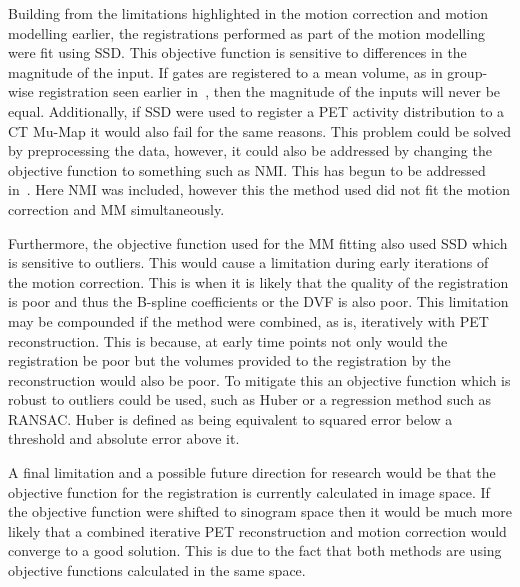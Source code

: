         Building from the limitations highlighted in the motion correction and motion modelling earlier, the registrations performed as part of the motion modelling were fit using \gls{SSD}. This objective function is sensitive to differences in the magnitude of the input. If gates are registered to a mean volume, as in group-wise registration seen earlier in~, then the magnitude of the inputs will never be equal. Additionally, if \gls{SSD} were used to register a \gls{PET} activity distribution to a \gls{CT} \gls{Mu-Map} it would also fail for the same reasons. This problem could be solved by preprocessing the data, however, it could also be addressed by changing the objective function to something such as \gls{NMI}. This has begun to be addressed in~. Here \gls{NMI} was included, however this the method used did not fit the motion correction and \gls{MM} simultaneously.
        
        Furthermore, the objective function used for the \gls{MM} fitting also used \gls{SSD} which is sensitive to outliers. This would cause a limitation during early iterations of the motion correction. This is when it is likely that the quality of the registration is poor and thus the B-spline coefficients or the \gls{DVF} is also poor. This limitation may be compounded if the method were combined, as is, iteratively with \gls{PET} reconstruction. This is because, at early time points not only would the registration be poor but the volumes provided to the registration by the reconstruction would also be poor. To mitigate this an objective function which is robust to outliers could be used, such as Huber or a regression method such as \gls{RANSAC}. Huber is defined as being equivalent to squared error below a threshold and absolute error above it.
        
        A final limitation and a possible future direction for research would be that the objective function for the registration is currently calculated in image space. If the objective function were shifted to sinogram space then it would be much more likely that a combined iterative \gls{PET} reconstruction and motion correction would converge to a good solution. This is due to the fact that both methods are using objective functions calculated in the same space.
